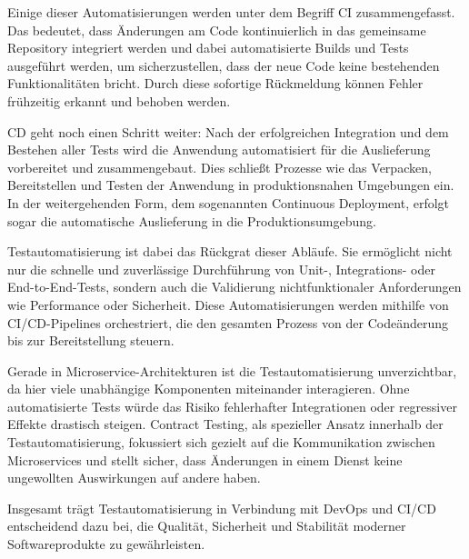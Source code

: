Einige dieser Automatisierungen werden unter dem Begriff \gls{CI} zusammengefasst.
Das bedeutet, dass Änderungen am Code kontinuierlich in das gemeinsame Repository integriert werden und dabei
automatisierte \glspl{Build} und Tests ausgeführt werden, um sicherzustellen, dass der neue Code keine bestehenden
Funktionalitäten bricht.
Durch diese sofortige Rückmeldung können Fehler frühzeitig erkannt und behoben werden.

\Gls{CD} geht noch einen Schritt weiter: Nach der erfolgreichen Integration und dem Bestehen aller Tests wird die
Anwendung automatisiert für die Auslieferung vorbereitet und zusammengebaut.
Dies schließt Prozesse wie das Verpacken, Bereitstellen und Testen der Anwendung in produktionsnahen Umgebungen ein.
In der weitergehenden Form, dem sogenannten Continuous Deployment, erfolgt sogar die automatische Auslieferung in die Produktionsumgebung.

Testautomatisierung ist dabei das Rückgrat dieser Abläufe.
Sie ermöglicht nicht nur die schnelle und zuverlässige Durchführung von Unit-, Integrations- oder End-to-End-Tests, sondern auch die Validierung nichtfunktionaler Anforderungen wie Performance oder Sicherheit.
Diese Automatisierungen werden mithilfe von \gls{CI}/\gls{CD}-Pipelines orchestriert, die den gesamten Prozess von der Codeänderung bis zur Bereitstellung steuern.

Gerade in Microservice-Architekturen ist die Testautomatisierung unverzichtbar, da hier viele unabhängige Komponenten miteinander interagieren.
Ohne automatisierte Tests würde das Risiko fehlerhafter Integrationen oder regressiver Effekte drastisch steigen.
Contract Testing, als spezieller Ansatz innerhalb der Testautomatisierung, fokussiert sich gezielt auf die Kommunikation zwischen Microservices und stellt sicher, dass Änderungen in einem Dienst keine ungewollten Auswirkungen auf andere haben.

Insgesamt trägt Testautomatisierung in Verbindung mit \gls{DevOps} und \gls{CI}/\gls{CD} entscheidend dazu bei, die Qualität, Sicherheit und Stabilität moderner Softwareprodukte zu gewährleisten.


